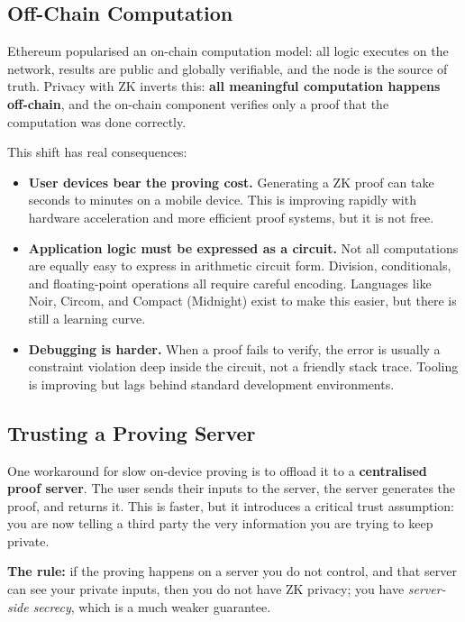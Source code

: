 \subsection*{Off-Chain Computation}

Ethereum popularised an on-chain computation model: all logic executes on the network, results are public and globally verifiable, and the node is the source of truth. Privacy with ZK inverts this: \textbf{all meaningful computation happens off-chain}, and the on-chain component verifies only a proof that the computation was done correctly.

This shift has real consequences:

\begin{itemize}
  \item \textbf{User devices bear the proving cost.} Generating a ZK proof can take seconds to minutes on a mobile device. This is improving rapidly with hardware acceleration and more efficient proof systems, but it is not free.
  \item \textbf{Application logic must be expressed as a circuit.} Not all computations are equally easy to express in arithmetic circuit form. Division, conditionals, and floating-point operations all require careful encoding. Languages like Noir, Circom, and Compact (Midnight) exist to make this easier, but there is still a learning curve.
  \item \textbf{Debugging is harder.} When a proof fails to verify, the error is usually a constraint violation deep inside the circuit, not a friendly stack trace. Tooling is improving but lags behind standard development environments.
\end{itemize}

\subsection*{Trusting a Proving Server}

One workaround for slow on-device proving is to offload it to a \textbf{centralised proof server}. The user sends their inputs to the server, the server generates the proof, and returns it. This is faster, but it introduces a critical trust assumption: you are now telling a third party the very information you are trying to keep private.

\begin{highlight}
\textbf{The rule:} if the proving happens on a server you do not control, and that server can see your private inputs, then you do not have ZK privacy; you have \emph{server-side secrecy}, which is a much weaker guarantee.
\end{highlight}

